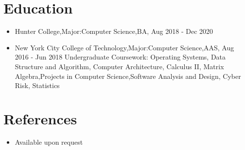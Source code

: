 \documentclass{article}
\begin{document}
\section{Education}
\begin{itemize}
\item Hunter College,Major:Computer Science,BA, Aug 2018 - Dec 2020
\item New York City College of Technology,Major:Computer Science,AAS, Aug 2016 - Jun 2018
\subitem Undergraduate Coursework: Operating Systems, Data Structure and Algorithm, Computer Architecture, Calculus II, 
Matrix Algebra,Projects in Computer Science,Software Analysis and Design, Cyber Risk, Statistics 
\end{itemize}

\section {References}
\begin{itemize}
\item Available upon request
\end{itemize}
\end{document}
